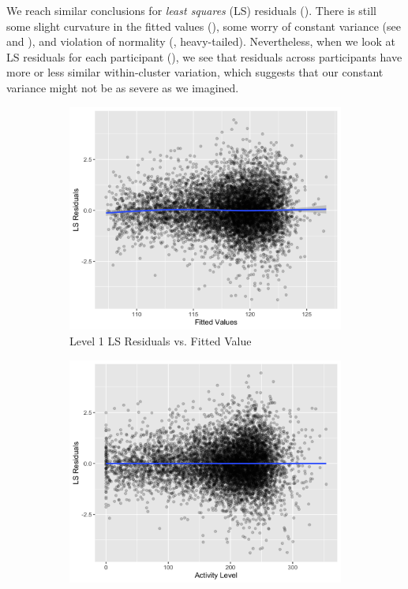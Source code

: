 \documentclass[12pt,twoside,letterpaper]{article}
\theoremstyle{definition}
\theoremstyle{definition}
\begin{document}
We reach similar conclusions for \emph{least squares} (LS) residuals (). There is still some slight curvature in the fitted values (), some worry of constant variance (see  and ), and violation of normality (, heavy-tailed). Nevertheless, when we look at LS residuals for each participant (), we see that residuals across participants have more or less similar within-cluster variation, which suggests that our constant variance might not be as severe as we imagined. 
    \begin{figure}[H] 
        \centering
        \begin{subfigure}[b]{0.4\textwidth}
        \centering
        \includegraphics[width=\textwidth]{pics/ls resid fit.png}
        \caption[]%
        {{\small Level 1 LS Residuals vs. Fitted Value}}
        \label{fig: ls resid v fit}
        \end{subfigure}
        \hfill
        \begin{subfigure}[b]{0.4\textwidth}
        \centering
        \includegraphics[width=\textwidth]{pics/ls resid act.png}

\end{subfigure}
\end{figure}
\end{document}
